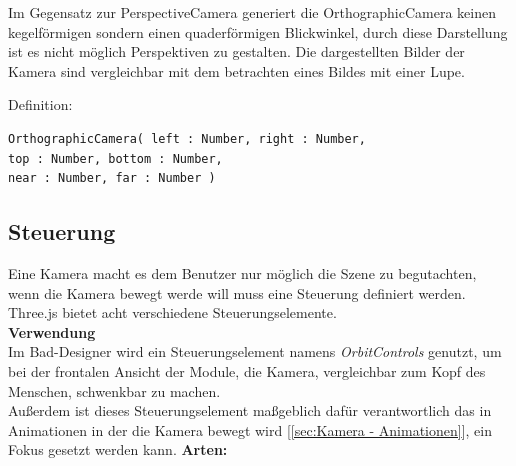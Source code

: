 \begin{itemize}
Im Gegensatz zur PerspectiveCamera generiert die OrthographicCamera keinen kegelförmigen sondern einen quaderförmigen Blickwinkel, durch diese Darstellung ist es nicht möglich Perspektiven zu gestalten. Die dargestellten Bilder der Kamera sind vergleichbar mit dem betrachten eines Bildes mit einer Lupe.

Definition:
\begin{lstlisting}
OrthographicCamera( left : Number, right : Number, 
top : Number, bottom : Number, 
near : Number, far : Number )
\end{lstlisting}
\end{itemize}
\subsection{Steuerung}
Eine Kamera macht es dem Benutzer nur möglich die Szene zu begutachten, wenn die Kamera bewegt werde will muss eine Steuerung definiert werden. \\ Three.js bietet acht verschiedene Steuerungselemente. \\
\textbf{Verwendung} \\
Im Bad-Designer wird ein Steuerungselement namens \textit{OrbitControls} genutzt, um bei der 
frontalen Ansicht der Module, die Kamera, vergleichbar zum Kopf des Menschen, schwenkbar zu machen. \\
Außerdem ist dieses Steuerungselement maßgeblich dafür verantwortlich das in Animationen in der die Kamera bewegt wird [\ref{sec:Kamera - Animationen}], ein Fokus gesetzt werden kann.
\newpage
\textbf{Arten:}  \cite{OrbitControls}
